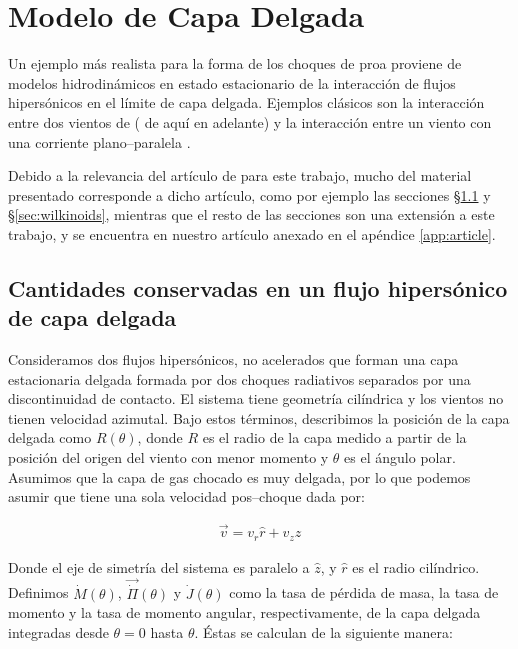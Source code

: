 \chapter{Modelo de Capa Delgada}
\label{chap:hipersonica}
\thispagestyle{empty}
\newcommand\CRW{\citetalias{Canto:1996}}

Un ejemplo más realista para la forma de los choques de proa proviene de modelos hidrodinámicos en estado estacionario de la interacción de flujos hipersónicos en el límite de capa delgada. Ejemplos clásicos son la interacción entre dos vientos de \citet{Canto:1996} (\CRW{} de aquí en adelante) y la interacción entre un viento con una corriente plano--paralela \citep{Wilkin:1996}.

Debido a la relevancia del artículo de \CRW{} para este trabajo, mucho del material presentado corresponde a dicho artículo, como por ejemplo las secciones \S \ref{sec:conserved-CRW} y \S \ref{sec:wilkinoids}, mientras que el resto de las secciones son una extensión a este trabajo, y se encuentra en nuestro artículo anexado en el apéndice \ref{app:article}.
\section{Cantidades conservadas en un flujo hipersónico de capa delgada}
\label{sec:conserved-CRW}
Consideramos dos flujos hipersónicos, no acelerados que forman una capa estacionaria delgada formada por dos choques radiativos separados por una discontinuidad de contacto. El sistema tiene geometría cilíndrica y los vientos no tienen velocidad azimutal. Bajo estos términos, describimos la posición de la capa delgada como $R(\theta)$, donde $R$ es el radio de la capa medido a partir de la posición del origen del viento con menor momento y $\theta$ es el ángulo polar. Asumimos que la capa de gas chocado es muy delgada, por lo que podemos asumir que tiene una sola velocidad pos--choque dada por:

\begin{align}
  \vec{v} = v_r \hat{r} + v_z \hat{z}
\end{align}

Donde el eje de simetría del sistema es paralelo a $\hat{z}$, y $\hat{r}$ es el radio cilíndrico. Definimos $\dot{M}(\theta)$, $\vec{\dot{\Pi}}(\theta)$ y $\dot{J}(\theta)$ como la tasa de pérdida de masa, la tasa de momento y la tasa de momento angular, respectivamente, de la capa delgada integradas desde $\theta=0$ hasta $\theta$. Éstas se calculan de la siguiente manera:

